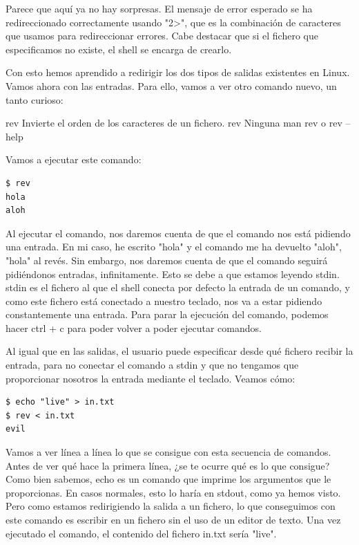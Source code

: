 Parece que aquí ya no hay sorpresas. El mensaje de error esperado se ha redireccionado correctamente usando "2>", que es la combinación de caracteres que usamos para redireccionar errores. Cabe destacar que si el fichero que especificamos no existe, el shell se encarga de crearlo.

Con esto hemos aprendido a redirigir los dos tipos de salidas existentes en Linux. Vamos ahora con las entradas. Para ello, vamos a ver otro comando nuevo, un tanto curioso:

\begin{command-info}
{rev}
{Invierte el orden de los caracteres de un fichero.}
{rev}
{Ninguna}
{man rev o rev --help}
\end{command-info}

Vamos a ejecutar este comando:

\begin{tcolorbox-code}
\begin{lstlisting}
$ rev
hola
aloh
\end{lstlisting}
\end{tcolorbox-code}

Al ejecutar el comando, nos daremos cuenta de que el comando nos está pidiendo una entrada. En mi caso, he escrito "hola" y el comando me ha devuelto "aloh", "hola" al revés. Sin embargo, nos daremos cuenta de que el comando seguirá pidiéndonos entradas, infinitamente. Esto se debe a que estamos leyendo stdin. stdin es el fichero al que el shell conecta por defecto la entrada de un comando, y como este fichero está conectado a nuestro teclado, nos va a estar pidiendo constantemente una entrada. Para parar la ejecución del comando, podemos hacer ctrl + c para poder volver a poder ejecutar comandos.

Al igual que en las salidas, el usuario puede especificar desde qué fichero recibir la entrada, para no conectar el comando a stdin y que no tengamos que proporcionar nosotros la entrada mediante el teclado. Veamos cómo:

\begin{tcolorbox-code}
\begin{lstlisting}
$ echo "live" > in.txt
$ rev < in.txt
evil
\end{lstlisting}
\end{tcolorbox-code}

Vamos a ver línea a línea lo que se consigue con esta secuencia de comandos. Antes de ver qué hace la primera línea, ¿se te ocurre qué es lo que consigue? Como bien sabemos, echo es un comando que imprime los argumentos que le proporcionas. En casos normales, esto lo haría en stdout, como ya hemos visto. Pero como estamos redirigiendo la salida a un fichero, lo que conseguimos con este comando es escribir en un fichero sin el uso de un editor de texto. Una vez ejecutado el comando, el contenido del fichero in.txt sería "live".

